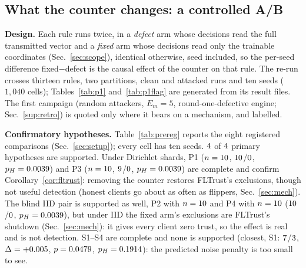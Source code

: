 \documentclass[journal]{IEEEtran}
\begin{document}
\subsection{What the counter changes: a controlled A/B}
\label{sec:p1}

\textbf{Design.} Each rule runs twice, in a \emph{defect} arm whose decisions read
the full transmitted vector and a \emph{fixed} arm whose decisions read only the
trainable coordinates (Sec.~\ref{sec:scope}), identical otherwise, seed included,
so the per-seed difference fixed$-$defect is the causal effect of the counter on
that rule. The re-run crosses thirteen rules, two partitions, clean and attacked
runs and ten seeds ($1{,}040$ cells); Tables~\ref{tab:p1} and~\ref{tab:p1flag} are generated
from its result files. The first campaign (random attackers,
$E_m=5$, round-one-defective engine; Sec.~\ref{sup:retro}) is quoted only where it
bears on a mechanism, and labelled.

\textbf{Confirmatory hypotheses.} Table~\ref{tab:prereg} reports the eight
registered comparisons (Sec.~\ref{sec:setup}); every cell has ten seeds. $4$ of
$4$ primary hypotheses are supported. Under Dirichlet shards, P1
($n=10$, $10$/$0$, $p_H=0.0039$) and P3
($n=10$, $9$/$0$, $p_H=0.0039$) are
complete and confirm Corollary~\ref{cor:fltrust}: removing the counter restores
FLTrust's exclusions, though not useful detection (honest clients go about as often as
flippers, Sec.~\ref{sec:mech}). The blind IID pair is supported as well, P2 with
$n=10$ and P4 with $n=10$
($10$/$0$, $p_H=0.0039$), but under IID the fixed
arm's exclusions are FLTrust's shutdown (Sec.~\ref{sec:mech}): it gives every client
zero trust, so the effect is real and is not detection. S1--S4 are complete and none
is supported (closest, S1: $7$/$3$, $\Delta=+0.005$,
$p=0.0479$, $p_H=0.1914$): the predicted noise penalty is too small to see.
\end{document}

